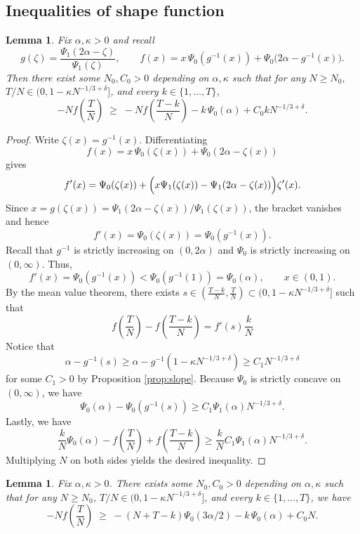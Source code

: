 \documentclass[11pt]{article}
\newtheorem{lemma}[theorem]{Lemma}
\theoremstyle{definition}
\begin{document}
\subsection{Inequalities of shape function}
\begin{lemma}\label{lem:shape_linear_bound}
Fix $\alpha,\kappa>0$ and recall
\[
g(\zeta)=\frac{\Psi_1(2\alpha-\zeta)}{\Psi_1(\zeta)},\qquad 
f(x)=x\,\Psi_0(g^{-1}(x))+\Psi_0\bigl(2\alpha-g^{-1}(x)\bigr).
\]
Then there exist some $N_0,C_0 > 0$ depending on $\alpha,\kappa$ such that for any $N \geq N_0$, $T/N\in(0,1 - \kappa N^{-1/3+\delta}]$, and every $k\in\{1,\dots,T\}$,
\begin{equation}\label{eq:strict_shape_ineq}
-Nf\left( \frac{T}N\right)\;\geq \;-Nf\!\left(\frac{T-k}{N}\right)-k\,\Psi_0(\alpha) + C_0kN^{-1/3+\delta}.
\end{equation}
\end{lemma}
\begin{proof}
Write $\zeta(x)=g^{-1}(x)$. Differentiating
\[
f(x)=x\,\Psi_0(\zeta(x))+\Psi_0(2\alpha-\zeta(x))
\]
gives
\[
f'(x)=\Psi_0(\zeta(x))+\Bigl(x\Psi_1(\zeta(x))-\Psi_1(2\alpha-\zeta(x))\Bigr)\zeta'(x).
\]
Since $x=g(\zeta(x))=\Psi_1(2\alpha-\zeta(x))/\Psi_1(\zeta(x))$, the bracket vanishes and hence
\begin{equation}\label{eq:fprime}
f'(x)=\Psi_0(\zeta(x))=\Psi_0(g^{-1}(x)).
\end{equation}
Recall that $g^{-1}$ is strictly increasing on $(0,2\alpha)$ and $\Psi_0$ is strictly increasing on $(0,\infty)$. Thus,
\[
f'(x)=\Psi_0(g^{-1}(x))<\Psi_0(g^{-1}(1)) = \Psi_0(\alpha),\qquad x\in(0,1).
\]
By the mean value theorem, there exists
$s\in(\frac{T-k}{N},\frac{T}{N})\subset(0,1-\kappa N^{-1/3+\delta}]$ such that
\[
f\left(\frac{T}{N}\right)-f\left(\frac{T-k}{N}\right)=f'(s)\frac{k}{N}
\]
Notice that 
\[
\alpha - g^{-1}(s) \geq \alpha- g^{-1}\left(1-\kappa N^{-1/3+\delta}\right) \geq C_1N^{-1/3+\delta}
\]
for some $C_1 > 0$ by Proposition \ref{prop:slope}. Because $\Psi_0$ is strictly concave on $(0, \infty)$, we have
\[
\Psi_0(\alpha) - \Psi_0(g^{-1}(s)) \geq C_1\Psi_1(\alpha)N^{-1/3+\delta}.
\]
Lastly, we have
\[
\frac{k}{N}\Psi_0(\alpha) - f\left(\frac{T}{N}\right)+f\left(\frac{T-k}{N}\right) \geq \frac{k}{N}C_1\Psi_1(\alpha)N^{-1/3+\delta}.
\]
Multiplying $N$ on both sides yields the desired inequality.
\end{proof}

\begin{lemma}\label{lem:shape_rect_bound}
Fix $\alpha, \kappa > 0$. There exists some $N_0, C_0 > 0$ depending on $\alpha, \kappa$ such that for any $N \geq N_0$, $T/N\in(0,1 - \kappa N^{-1/3+\delta}]$, and every $k\in\{1,\dots,T\}$, we have
\begin{equation}\label{eq:strict_shape_ineq}
-Nf\left( \frac{T}N\right)\;\geq \;-(N+T-k)\Psi_0(3\alpha/2)-k\,\Psi_0(\alpha) + C_0N.
\end{equation}
\end{lemma}
\end{document}
